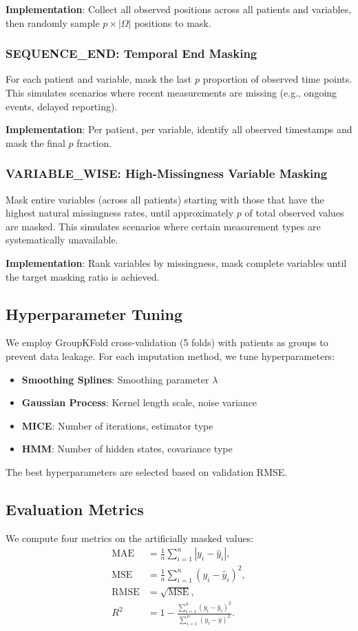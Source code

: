 \documentclass[11pt]{article}
\begin{document}
\textbf{Implementation}: Collect all observed positions across all patients and variables, then randomly sample $p \times |\Omega|$ positions to mask.

\subsubsection{SEQUENCE\_END: Temporal End Masking}
For each patient and variable, mask the last $p$ proportion of observed time points. This simulates scenarios where recent measurements are missing (e.g., ongoing events, delayed reporting).

\textbf{Implementation}: Per patient, per variable, identify all observed timestamps and mask the final $p$ fraction.

\subsubsection{VARIABLE\_WISE: High-Missingness Variable Masking}
Mask entire variables (across all patients) starting with those that have the highest natural missingness rates, until approximately $p$ of total observed values are masked. This simulates scenarios where certain measurement types are systematically unavailable.

\textbf{Implementation}: Rank variables by missingness, mask complete variables until the target masking ratio is achieved.

\subsection{Hyperparameter Tuning}
We employ GroupKFold cross-validation (5 folds) with patients as groups to prevent data leakage. For each imputation method, we tune hyperparameters:
\begin{itemize}[noitemsep]
    \item \textbf{Smoothing Splines}: Smoothing parameter $\lambda$
    \item \textbf{Gaussian Process}: Kernel length scale, noise variance
    \item \textbf{MICE}: Number of iterations, estimator type
    \item \textbf{HMM}: Number of hidden states, covariance type
\end{itemize}

The best hyperparameters are selected based on validation RMSE.

\subsection{Evaluation Metrics}
We compute four metrics on the artificially masked values:
\begin{align}
\text{MAE} &= \frac{1}{n} \sum_{i=1}^{n} |y_i - \hat{y}_i|, \\
\text{MSE} &= \frac{1}{n} \sum_{i=1}^{n} (y_i - \hat{y}_i)^2, \\
\text{RMSE} &= \sqrt{\text{MSE}}, \\
R^2 &= 1 - \frac{\sum_{i=1}^{n} (y_i - \hat{y}_i)^2}{\sum_{i=1}^{n} (y_i - \bar{y})^2}.
\end{align}
\end{document}
